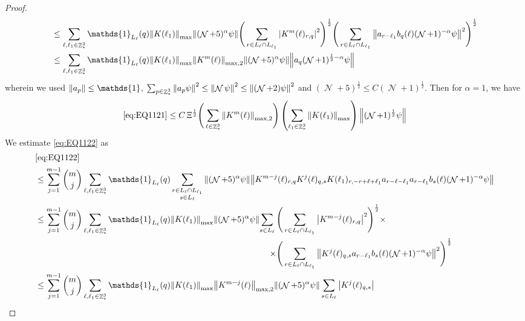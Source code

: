 \documentclass[sn-mathphys, Numbered ,a4paper]{sn-jnl}%
\DeclareMathOperator{\Z}{\mathbb{Z}}
\DeclareMathOperator{\NN}{\mathcal{N}}
\newcommand{\half}{\frac{1}{2}}
\theoremstyle{plain}
\theoremstyle{definition}
\theoremstyle{remark}
\theoremstyle{plain}
\theoremstyle{definition}
\theoremstyle{remark}
\begin{document}
\begin{proof}
\begin{align}
	 &\leq \sum\limits_{\ell, \ell_1\in \Z^3_*} \mathds{1}_{L_{\ell}}(q) \norm{K(\ell_1) }_{\mathrm{max}} \norm{  (\NN+5)^{\alpha} \psi} \Bigg( \sum\limits_{r\in L_{\ell} \cap L_{\ell_1}}  \abs{ K^m(\ell)_{r,q}}^2 \Bigg)^\half \Bigg( \sum\limits_{r\in L_{\ell} \cap L_{\ell_1}} \norm{ a_{r-\ell_1} b_{q}(\ell) (\NN+1)^{-\alpha} \psi }^2 \Bigg)^\half \nonumber\\
	 &\leq \sum\limits_{\ell, \ell_1\in \Z^3_*} \mathds{1}_{L_{\ell}}(q) \norm{K(\ell_1) }_{\mathrm{max}}   \norm{ K^m(\ell)}_{\mathrm{max,2}} \norm{(\NN+5)^{\alpha} \psi} \norm{ a_q (\NN+1)^{\half-\alpha} \psi } \nonumber\\
\end{align}
wherein we used $\norm{a_p} \leq \mathds{1}$, $\sum_{p\in \Z^3_*}\norm{a_p \psi}^2\leq\norm{\NN\psi}^2\leq \norm{(\NN+2)\psi}^2$ and $(\NN+5)^\half\leq C(\NN+1)^\half$. Then for $\alpha = 1$, we have
\begin{equation}
	\eqref{eq:EQ1121}\leq C\, \Xi^\half \Bigg( \sum\limits_{\ell\in \Z^3_*} \norm{ K^m(\ell)}_{\mathrm{max,2}} \Bigg) \left(\sum\limits_{\ell_1\in \Z^3_*} \norm{K(\ell_1)}_{\mathrm{max}} \right) \norm{(\NN+1)^\half \psi} \label{eq:estEQ1121}
\end{equation} 
We estimate \eqref{eq:EQ1122} as
\begin{alignat}{2}
	&\eqref{eq:EQ1122}\nonumber\\
	&\leq \sum\limits_{j=1}^{m-1} {{m}\choose j}\sum\limits_{\ell, \ell_1\in \Z^3_*} \mathds{1}_{L_{\ell}}(q) \sum\limits_{\substack{r\in L_{\ell} \cap L_{\ell_1}\\s\in L_{\ell}}} \norm{  (\NN+5)^{\alpha} \psi}\norm{  K^{m-j}(\ell)_{r,q} K^{j}(\ell)_{q,s} K(\ell_1)_{r,-r+\ell+\ell_1} a_{r-\ell-\ell_1} a_{r-\ell_1} b_{s}(\ell)  (\NN+1)^{-\alpha} \psi }\nonumber\\
	&\leq \sum\limits_{j=1}^{m-1} {{m}\choose j}\sum\limits_{\ell, \ell_1\in \Z^3_*} \mathds{1}_{L_{\ell}}(q) \norm{K(\ell_1)}_{\mathrm{max}} \norm{ (\NN+5)^{\alpha} \psi} \begin{aligned}[t] \sum\limits_{s\in L_{\ell}} 
		\Bigg(&\sum\limits_{r\in L_{\ell} \cap L_{\ell_1}}\abs{K^{m-j}(\ell)_{r,q} }^2\Bigg)^\half \times\nonumber\\ 
		\times\Bigg( &\sum\limits_{r\in L_{\ell} \cap L_{\ell_1}}\norm{K^{j}(\ell)_{q,s} a_{r-\ell_1} b_{s}(\ell)  (\NN+1)^{-\alpha} \psi }^2 \Bigg)^\half		
	\end{aligned}\nonumber\\
	&\leq \sum\limits_{j=1}^{m-1} {{m}\choose j}\sum\limits_{\ell, \ell_1\in \Z^3_*} \mathds{1}_{L_{\ell}}(q) \norm{K(\ell_1)}_{\mathrm{max}} \norm{K^{m-j}(\ell)}_{\mathrm{max,2}} \norm{ (\NN+5)^{\alpha} \psi} \sum\limits_{s\in L_{\ell}}\abs{K^{j}(\ell)_{q,s}}

\end{alignat}
\end{proof}
\end{document}
